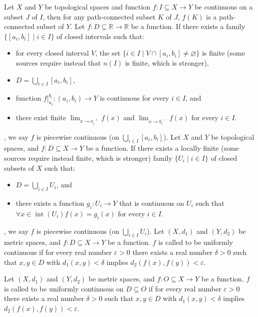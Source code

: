 \documentclass[a4paper,12pt]{report}
\begin{document}
\begin{itemize}
\begin{itemize}
Let $X$ and $Y$ be topological spaces and function $f\colon I\subseteq X\to Y$ be continuous on a subset $J$ of $I$, then for any path-connected subset $K$ of $J$, $f(K)$ is a path-connected subset of $Y$.
Let $f\colon D\subseteq\mathbb{R}\to\mathbb{R}$ be a function. If there exists a family $\{[a_i,b_i]\mid i\in I\}$ of closed intervals such that:
\begin{itemize}
\item for every closed interval $V$, the set $\{i\in I\mid V\cap [a_i,b_i]\neq\varnothing\}$ is finite (some sources require instead that $n(I)$ is finite, which is stronger),
\item $D=\bigcup_{i\in I}[a_i,b_i]$,
\item function $f\big\vert_{a_i}^{b_i}\colon(a_i,b_i)\to Y$ is continuous for every $i\in I$, and
\item there exist finite $\lim_{x\to a_i^{\phantom{i}+}}f(x)$ and $\lim_{x\to b_i^{\phantom{i}-}}f(x)$ for every $i\in I$.
\end{itemize},
we say $f$ is piecewise continuous (on $\bigcup_{i\in I}[a_i,b_i]$).
Let $X$ and $Y$ be topological spaces, and $f\colon D\subseteq X\to Y$ be a function. If there exists a locally finite (some sources require instead finite, which is stronger) family $\{U_i\mid i\in I\}$ of closed subsets of $X$ such that:
\begin{itemize}
\item $D=\bigcup_{i\in I}U_i$, and
\item there exists a function $g_i\colon U_i\to Y$ that is continuous on $U_i$ such that $\forall x\in\operatorname{int}\left(U_i\right)f(x)=g_i(x)$ for every $i\in I$.
\end{itemize},
we say $f$ is piecewise continuous (on $\bigcup_{i\in I}U_i$).
Let $(X,d_1)$ and $(Y,d_2)$ be metric spaces, and $f\colon D\subseteq X\to Y$ be a function. $f$ is called to be uniformly continuous if for every real number $\varepsilon >0$ there exists a real number $\delta >0$ such that $x,y\in D$ with $d_{1}(x,y)<\delta$ implies $d_{2}(f(x),f(y))<\varepsilon$.

Let $(X,d_1)$ and $(Y,d_2)$ be metric spaces, and $f\colon O\subseteq X\to Y$ be a function. $f$ is called to be uniformly continuous on $D\subseteq O$ if for every real number $\varepsilon >0$ there exists a real number $\delta >0$ such that $x,y\in D$ with $d_{1}(x,y)<\delta$ implies $d_{2}(f(x),f(y))<\varepsilon$.


\end{itemize}
\end{itemize}
\end{document}
